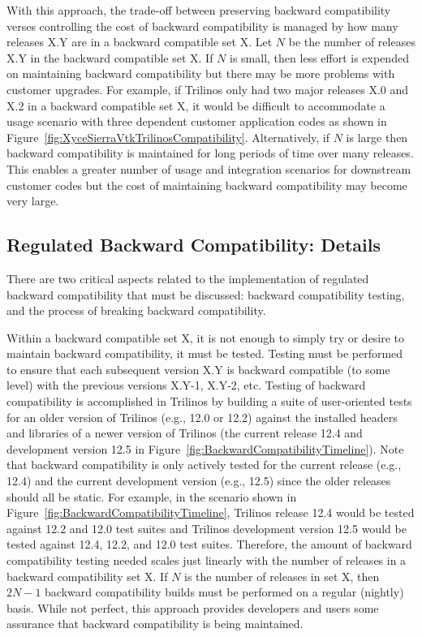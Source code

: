 \documentclass[11pt]{SANDreport}
\begin{document}
With this approach, the trade-off between preserving backward
compatibility verses controlling the cost of backward compatibility is
managed by how many releases X.Y are in a backward compatible set X.
Let $N$ be the number of releases X.Y in the backward compatible set
X.  If $N$ is small, then less effort is expended on maintaining
backward compatibility but there may be more problems with customer
upgrades.  For example, if Trilinos only had two major releases X.0
and X.2 in a backward compatible set X, it would be difficult to
accommodate a usage scenario with three dependent customer application
codes as shown in Figure~\ref{fig:XyceSierraVtkTrilinosCompatibility}.
Alternatively, if $N$ is large then backward compatibility is
maintained for long periods of time over many releases.  This enables
a greater number of usage and integration scenarios for downstream
customer codes but the cost of maintaining backward compatibility may
become very large.


%
{}\subsection{Regulated Backward Compatibility: Details}
\label{sec:details_reg_back_compat}
%

There are two critical aspects related to the implementation of
regulated backward compatibility that must be discussed: backward
compatibility testing, and the process of breaking backward
compatibility.

Within a backward compatible set X, it is not enough to simply try or
desire to maintain backward compatibility, it must be tested.  Testing
must be performed to ensure that each subsequent version X.Y is
backward compatible (to some level) with the previous versions X.Y-1,
X.Y-2, etc.  Testing of backward compatibility is accomplished in
Trilinos by building a suite of user-oriented tests for an older
version of Trilinos (e.g., 12.0 or 12.2) against the installed headers
and libraries of a newer version of Trilinos (the current release 12.4
and development version 12.5 in
Figure~\ref{fig:BackwardCompatibilityTimeline}).  Note that backward
compatibility is only actively tested for the current release (e.g.,
12.4) and the current development version (e.g., 12.5) since the older
releases should all be static.  For example, in the scenario shown in
Figure~\ref{fig:BackwardCompatibilityTimeline}, Trilinos release 12.4
would be tested against 12.2 and 12.0 test suites and Trilinos
development version 12.5 would be tested against 12.4, 12.2, and 12.0
test suites.  Therefore, the amount of backward compatibility testing
needed scales just linearly with the number of releases in a backward
compatibility set X.  If $N$ is the number of releases in set X, then
$2 N-1$ backward compatibility builds must be performed on a regular
(nightly) basis.  While not perfect, this approach provides developers
and users some assurance that backward compatibility is being
maintained.
\end{document}
